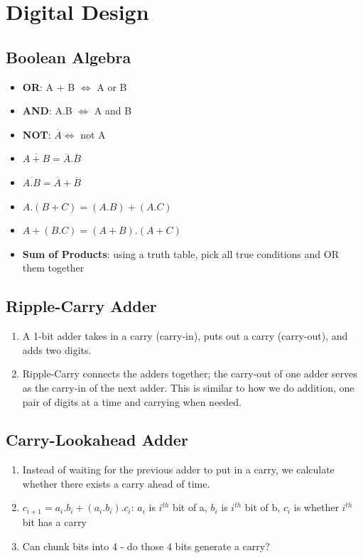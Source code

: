 \documentclass{article}
\begin{document}
\section{Digital Design}
\subsection{Boolean Algebra}
\begin{multicols}{3}
    \begin{itemize}
        \item \textbf{OR}: A + B $\iff$ A or B
        \item \textbf{AND}: A.B $\iff$ A and B
        \item \textbf{NOT}: $\overline{A} \iff$ not A
    \end{itemize}
\columnbreak
    \begin{itemize}
        \item $\overline{A + B} = \overline{A}.\overline{B}$
        \item $\overline{A.B} = \overline{A} + \overline{B}$
        \item $A.(B + C) = (A.B) + (A.C)$
    \end{itemize}
\columnbreak
    \begin{itemize}
        \item $A + (B.C) = (A + B).(A + C)$
        \item \textbf{Sum of Products}: using a truth table, pick all true conditions and OR them together
    \end{itemize}
\end{multicols}
\subsection{Ripple-Carry Adder}
\begin{enumerate}
    \item A 1-bit adder takes in a carry (carry-in), puts out a carry (carry-out), and adds two digits. 
    \item Ripple-Carry connects the adders together; the carry-out of one adder serves as the carry-in of the next adder. This is similar to how we do addition, one pair of digits at a time and carrying when needed.
\end{enumerate}
\subsection{Carry-Lookahead Adder}
\begin{enumerate}
    \item Instead of waiting for the previous adder to put in a carry, we calculate whether there exists a carry ahead of time.
    \item $c_{i + 1} = a_i.b_i + (a_i.b_i).c_i$: $a_i$ is $i^{th}$ bit of a, $b_i$ is $i^{th}$ bit of b, $c_i$ is whether $i^{th}$ bit has a carry
    \item Can chunk bits into 4 - do those 4 bits generate a carry?
\end{enumerate}
\end{document}
